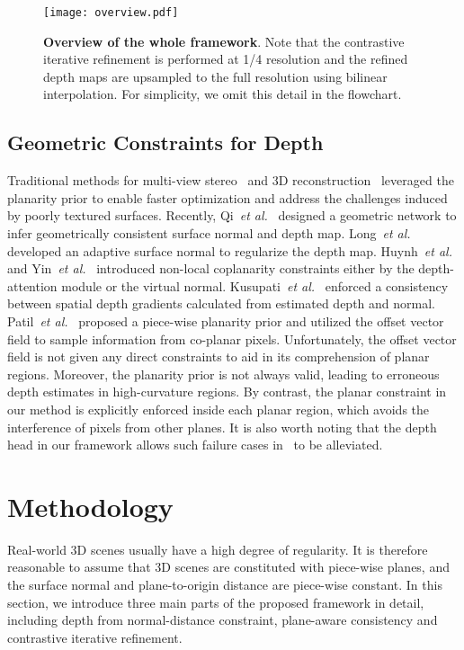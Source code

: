 \documentclass[10pt,twocolumn,letterpaper]{article}
\begin{document}
\begin{figure*}[!htb]
\centering
	\texttt{[image: overview.pdf]}\caption{\textbf{Overview of the whole framework}. Note that the contrastive iterative refinement is performed at 1/4 resolution and the refined depth maps are upsampled to the full resolution using bilinear interpolation. For simplicity, we omit this detail in the flowchart.  }
	\label{Fig2}
\end{figure*}
\subsection{Geometric Constraints for Depth}

Traditional methods for multi-view stereo~\cite{gallup2010piecewise} and 3D reconstruction~\cite{chauve2010robust,bodis2014fast} leveraged the planarity prior to enable faster optimization and address the challenges induced by poorly textured surfaces. Recently, Qi~\textit{et al.}~\cite{qi2018geonet} designed a geometric network to infer geometrically consistent surface normal and depth map. Long~\textit{et al.}~\cite{Long_2021_ICCV} developed an adaptive surface normal to regularize the depth map. 
Huynh~\textit{et al.}~\cite{huynh2020guiding} and Yin~\textit{et al.}~\cite{yin2019enforcing} introduced non-local coplanarity constraints either by the depth-attention module or the virtual normal. Kusupati~\textit{et al.}~\cite{kusupati2020normal} enforced a consistency
between spatial depth gradients calculated from estimated
depth and normal. Patil~\textit{et al.}~\cite{patil2022p3depth} proposed a piece-wise planarity prior and utilized the offset vector field to sample information from co-planar pixels. Unfortunately, the offset vector field is not given any direct constraints to aid in its comprehension of planar regions. Moreover, the planarity prior is not always valid, leading to erroneous depth estimates in high-curvature regions. By contrast, the planar constraint in our method is explicitly enforced inside each planar region, which avoids the interference of pixels from other planes. It is also worth noting that the depth head in our framework allows such failure cases in~\cite{patil2022p3depth} to be alleviated.

\section{Methodology}
Real-world 3D scenes usually have a high degree of regularity. It is therefore reasonable to assume that 3D scenes are constituted with piece-wise planes, and the surface normal and plane-to-origin distance are piece-wise constant. In this section, we introduce three main parts of the proposed framework in detail, including depth from normal-distance constraint, plane-aware consistency and contrastive iterative refinement.
\end{document}
